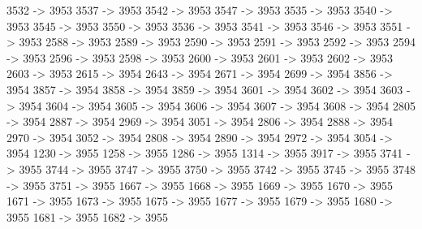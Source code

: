{	3532 -> 3953
	3537 -> 3953
	3542 -> 3953
	3547 -> 3953
	3535 -> 3953
	3540 -> 3953
	3545 -> 3953
	3550 -> 3953
	3536 -> 3953
	3541 -> 3953
	3546 -> 3953
	3551 -> 3953
	2588 -> 3953
	2589 -> 3953
	2590 -> 3953
	2591 -> 3953
	2592 -> 3953
	2594 -> 3953
	2596 -> 3953
	2598 -> 3953
	2600 -> 3953
	2601 -> 3953
	2602 -> 3953
	2603 -> 3953
	2615 -> 3954
	2643 -> 3954
	2671 -> 3954
	2699 -> 3954
	3856 -> 3954
	3857 -> 3954
	3858 -> 3954
	3859 -> 3954
	3601 -> 3954
	3602 -> 3954
	3603 -> 3954
	3604 -> 3954
	3605 -> 3954
	3606 -> 3954
	3607 -> 3954
	3608 -> 3954
	2805 -> 3954
	2887 -> 3954
	2969 -> 3954
	3051 -> 3954
	2806 -> 3954
	2888 -> 3954
	2970 -> 3954
	3052 -> 3954
	2808 -> 3954
	2890 -> 3954
	2972 -> 3954
	3054 -> 3954
	1230 -> 3955
	1258 -> 3955
	1286 -> 3955
	1314 -> 3955
	3917 -> 3955
	3741 -> 3955
	3744 -> 3955
	3747 -> 3955
	3750 -> 3955
	3742 -> 3955
	3745 -> 3955
	3748 -> 3955
	3751 -> 3955
	1667 -> 3955
	1668 -> 3955
	1669 -> 3955
	1670 -> 3955
	1671 -> 3955
	1673 -> 3955
	1675 -> 3955
	1677 -> 3955
	1679 -> 3955
	1680 -> 3955
	1681 -> 3955
	1682 -> 3955
}            
